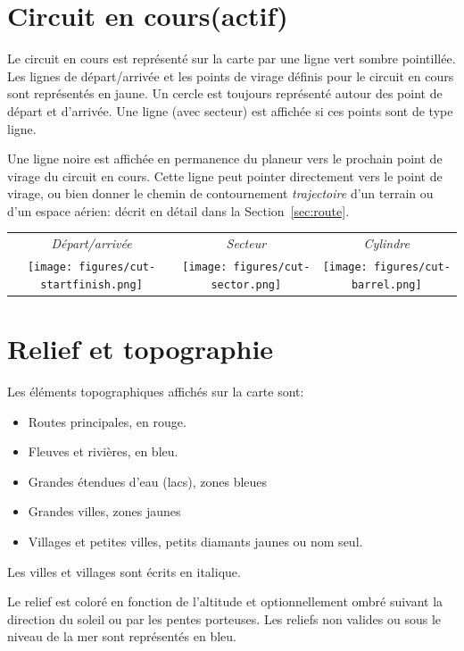 \section{Circuit en cours(actif)}
Le circuit en cours est représenté sur la carte par une ligne vert sombre pointillée.
Les lignes de départ/arrivée et les points de virage définis pour le circuit en cours sont représentés en jaune.
Un cercle est toujours représenté autour des point de départ et d'arrivée. Une ligne (avec secteur) est affichée si ces points sont de type ligne. 

Une ligne noire est affichée en permanence du planeur vers le prochain point de virage du circuit en cours. Cette ligne peut pointer directement vers le point de virage, ou bien donner le chemin  de contournement {\em trajectoire} d'un terrain ou d'un espace aérien: décrit en détail dans la Section~\ref{sec:route}.

\begin{center}
\begin{tabular}{c c c}
{\it Départ/arrivée} & {\it Secteur} & {\it Cylindre} \\
\texttt{[image: figures/cut-startfinish.png]} &
\texttt{[image: figures/cut-sector.png]} &
\texttt{[image: figures/cut-barrel.png]} \\
\end{tabular}
\end{center}

\section{Relief et topographie}\label{sec:terrain_topo}

Les éléments topographiques affichés sur la carte sont:
\begin{itemize}
\item Routes principales, en rouge.
\item Fleuves et rivières, en bleu.
\item Grandes étendues d'eau (lacs), zones bleues
\item Grandes villes, zones jaunes
\item Villages et petites villes, petits diamants jaunes ou nom seul.
\end{itemize}
Les villes et villages sont écrits en italique.

Le relief est coloré en fonction de l'altitude et optionnellement ombré suivant la direction du soleil ou par les pentes porteuses. Les reliefs non valides ou sous le niveau de la mer sont représentés en bleu.

